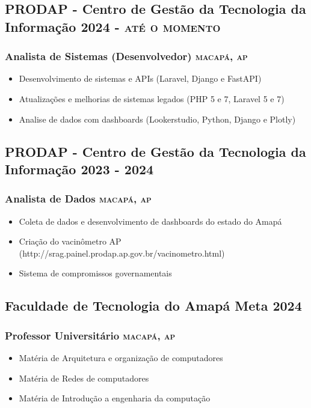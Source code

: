\documentclass{article}
\newcommand{\rside}[1]{\hfill \normalfont\scshape\MakeLowercase{#1}}
\begin{document}
\subsection{PRODAP - Centro de Gestão da Tecnologia da Informação \rside{2024 - Até o momento}}
\subsubsection{Analista de Sistemas (Desenvolvedor)  \rside{Macapá, AP}}
\begin{itemize}
  \item Desenvolvimento de sistemas e APIs (Laravel, Django e FastAPI)
  \item Atualizações e melhorias de sistemas legados (PHP 5 e 7, Laravel 5 e 7)
  \item Analise de dados com dashboards (Lookerstudio, Python, Django e Plotly)
\end{itemize}

\subsection{PRODAP - Centro de Gestão da Tecnologia da Informação  \rside{2023 - 2024}}
\subsubsection{ Analista de Dados  \rside{Macapá, AP}}
\begin{itemize}
  \item Coleta de dados e desenvolvimento de dashboards do estado do Amapá
  \item Criação do vacinômetro AP (http://srag.painel.prodap.ap.gov.br/vacinometro.html)
  \item Sistema de compromissos governamentais
\end{itemize}

\subsection{Faculdade de Tecnologia do Amapá Meta   \rside{2024}}
\subsubsection{ Professor Universitário  \rside{Macapá, AP}}
\begin{itemize}
  \item Matéria de Arquitetura e organização de computadores
  \item Matéria de Redes de computadores
  \item Matéria de Introdução a engenharia da computação
\end{itemize}
\end{document}
